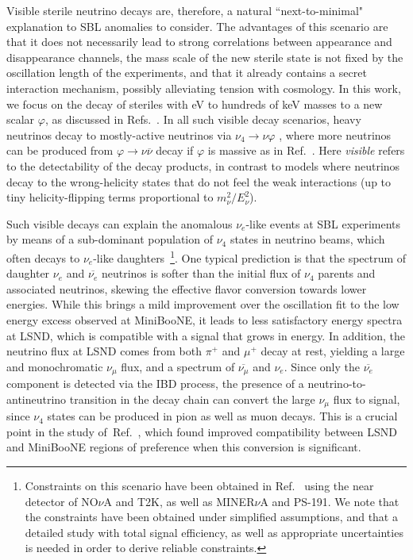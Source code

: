 \documentclass[
reprint,
superscriptaddress,
showpacs,
preprintnumbers,
nofootinbib,
nobibnotes,
amsmath,
amssymb, 
aps,
prd,
floatfix
]{revtex4-1}
\newcommand{\refref}[1]{Ref.~\cite{#1}}
\renewcommand{\phi}{\varphi}
\begin{document}
Visible sterile neutrino decays are, therefore, a natural ``next-to-minimal" explanation to SBL anomalies to consider. The advantages of this scenario are that it does not necessarily lead to strong correlations between appearance and disappearance channels, the mass scale of the new sterile state is not fixed by the oscillation length of the experiments, and that it already contains a secret interaction mechanism, possibly alleviating tension with cosmology. In this work, we focus on the decay of steriles with eV to hundreds of keV masses to a new scalar $\phi$, as discussed in Refs.~\cite{PalomaresRuiz:2005vf,Bai:2015ztj,Moss:2017pur,Dentler:2019dhz,deGouvea:2019qre}. In all such visible decay scenarios, heavy neutrinos decay to mostly-active neutrinos via $\nu_4 \to \nu \phi$ , where more neutrinos can be produced from $\phi\to \nu\overline{\nu}$ decay if $\phi$ is massive as in Ref.~\cite{Dentler:2019dhz}. Here \emph{visible} refers to the detectability of the decay products, in contrast to models where neutrinos decay to the wrong-helicity states that do not feel the weak interactions (up to tiny helicity-flipping terms proportional to $m^2_\nu/E_\nu^2$). 

Such visible decays can explain the anomalous $\nu_e$-like events at SBL experiments by means of a sub-dominant population of $\nu_4$ states in neutrino beams, which often decays to $\nu_e$-like daughters~\footnote{Constraints on this scenario have been obtained in Ref.~\cite{Brdar:2020tle} using the near detector of NO$\nu$A and T2K, as well as MINER$\nu$A and PS-191. We note that the constraints have been obtained under simplified assumptions, and that a detailed study with total signal efficiency, as well as appropriate uncertainties is needed in order to derive reliable constraints.}. One typical prediction is that the spectrum of daughter $\nu_e$ and $\overline{\nu_e}$ neutrinos is softer than the initial flux of $\nu_4$ parents and associated neutrinos, skewing the effective flavor conversion towards lower energies. While this brings a mild improvement over the oscillation fit to the low energy excess observed at MiniBooNE, it leads to less satisfactory energy spectra at LSND, which is compatible with a signal that grows in energy. In addition, the neutrino flux at LSND comes from both $\pi^+$ and $\mu^+$ decay at rest, yielding a large and monochromatic $\nu_\mu$ flux, and a spectrum of $\overline{\nu_\mu}$ and $\nu_e$. Since only the $\overline{\nu_e}$ component is detected via the IBD process, the presence of a neutrino-to-antineutrino transition in the decay chain can convert the large $\nu_\mu$ flux to signal, since $\nu_4$ states can be produced in pion as well as muon decays. This is a crucial point in the study of~\refref{Dentler:2019dhz}, which found improved compatibility between LSND and MiniBooNE regions of preference when this conversion is significant.
\end{document}
